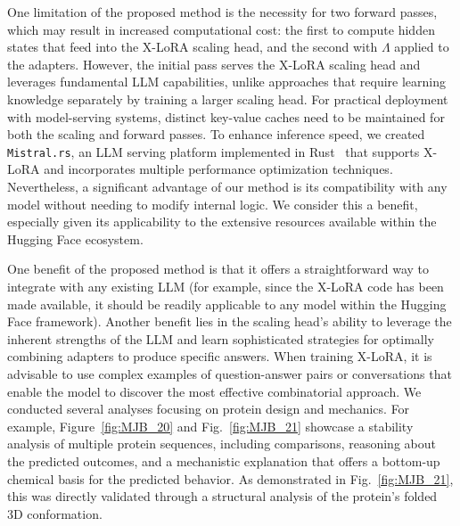 One limitation of the proposed method is the necessity for two forward passes, which may result in increased computational cost: the first to compute hidden states that feed into the X-LoRA scaling head, and the second with $\Lambda$ applied to the adapters. However, the initial pass serves the X-LoRA scaling head and leverages fundamental LLM capabilities, unlike approaches that require learning knowledge separately by training a larger scaling head. For practical deployment with model-serving systems, distinct key-value caches need to be maintained for both the scaling and forward passes. To enhance inference speed, we created \texttt{Mistral.rs}, an LLM serving platform implemented in Rust~\cite{matsakis2014rust} that supports X-LoRA and incorporates multiple performance optimization techniques. Nevertheless, a significant advantage of our method is its compatibility with any model without needing to modify internal logic. We consider this a benefit, especially given its applicability to the extensive resources available within the Hugging Face ecosystem.

One benefit of the proposed method is that it offers a straightforward way to integrate with any existing LLM (for example, since the X-LoRA code has been made available, it should be readily applicable to any model within the Hugging Face framework). Another benefit lies in the scaling head's ability to leverage the inherent strengths of the LLM and learn sophisticated strategies for optimally combining adapters to produce specific answers. When training X-LoRA, it is advisable to use complex examples of question-answer pairs or conversations that enable the model to discover the most effective combinatorial approach. We conducted several analyses focusing on protein design and mechanics. For example, Figure~\ref{fig:MJB_20} and Fig.~\ref{fig:MJB_21} showcase a stability analysis of multiple protein sequences, including comparisons, reasoning about the predicted outcomes, and a mechanistic explanation that offers a bottom-up chemical basis for the predicted behavior. As demonstrated in Fig.~\ref{fig:MJB_21}, this was directly validated through a structural analysis of the protein’s folded 3D conformation.

